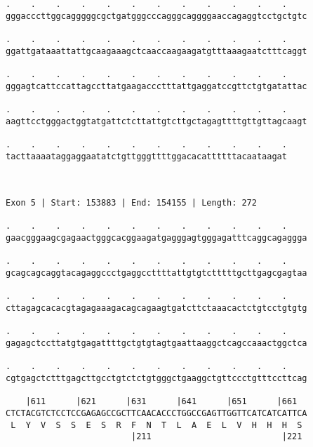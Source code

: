 \documentclass{article}
\begin{document}
\begin{Verbatim}
.    .    .    .    .    .    .    .    .    .    .    .    
gggacccttggcagggggcgctgatgggcccagggcaggggaaccagaggtcctgctgtc
                                                            
.    .    .    .    .    .    .    .    .    .    .    .    
ggattgataaattattgcaagaaagctcaaccaagaagatgtttaaagaatctttcaggt
                                                            
.    .    .    .    .    .    .    .    .    .    .    .    
gggagtcattccattagccttatgaagaccctttattgaggatccgttctgtgatattac
                                                            
.    .    .    .    .    .    .    .    .    .    .    .    
aagttcctgggactggtatgattctcttattgtcttgctagagttttgttgttagcaagt
                                                            
.    .    .    .    .    .    .    .    .    .    .    .
tacttaaaataggaggaatatctgttgggttttggacacattttttacaataagat
                                                        
                                                        
 
Exon 5 | Start: 153883 | End: 154155 | Length: 272
 
.    .    .    .    .    .    .    .    .    .    .    .    
gaacgggaagcgagaactgggcacggaagatgagggagtgggagatttcaggcagaggga
                                                            
.    .    .    .    .    .    .    .    .    .    .    .    
gcagcagcaggtacagaggccctgaggccttttattgtgtctttttgcttgagcgagtaa
                                                            
.    .    .    .    .    .    .    .    .    .    .    .    
cttagagcacacgtagagaaagacagcagaagtgatcttctaaacactctgtcctgtgtg
                                                            
.    .    .    .    .    .    .    .    .    .    .    .    
gagagctccttatgtgagattttgctgtgtagtgaattaaggctcagccaaactggctca
                                                            
.    .    .    .    .    .    .    .    .    .    .    .    
cgtgagctctttgagcttgcctgtctctgtgggctgaaggctgttccctgtttccttcag
                                                            
    |611      |621      |631      |641      |651      |661  
CTCTACGTCTCCTCCGAGAGCCGCTTCAACACCCTGGCCGAGTTGGTTCATCATCATTCA
 L  Y  V  S  S  E  S  R  F  N  T  L  A  E  L  V  H  H  H  S 
                         |211                          |221 
  

\end{Verbatim}
\end{document}
